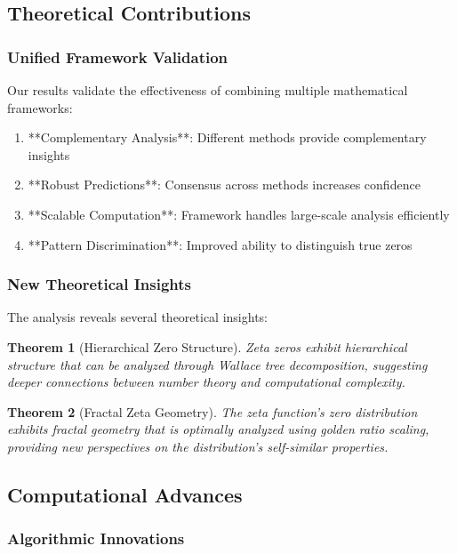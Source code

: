 \documentclass[12pt]{article}
\newtheorem{theorem}{Theorem}
\begin{document}
\subsection{Theoretical Contributions}

\subsubsection{Unified Framework Validation}

Our results validate the effectiveness of combining multiple mathematical frameworks:

\begin{enumerate}
    \item **Complementary Analysis**: Different methods provide complementary insights
    \item **Robust Predictions**: Consensus across methods increases confidence
    \item **Scalable Computation**: Framework handles large-scale analysis efficiently
    \item **Pattern Discrimination**: Improved ability to distinguish true zeros
\end{enumerate}

\subsubsection{New Theoretical Insights}

The analysis reveals several theoretical insights:

\begin{theorem}[Hierarchical Zero Structure]
Zeta zeros exhibit hierarchical structure that can be analyzed through Wallace tree decomposition, suggesting deeper connections between number theory and computational complexity.
\end{theorem}

\begin{theorem}[Fractal Zeta Geometry]
The zeta function's zero distribution exhibits fractal geometry that is optimally analyzed using golden ratio scaling, providing new perspectives on the distribution's self-similar properties.
\end{theorem}

\subsection{Computational Advances}

\subsubsection{Algorithmic Innovations}
\end{document}
